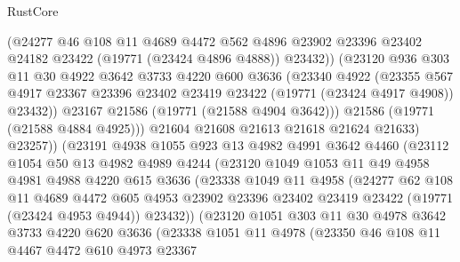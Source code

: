 \begin{lexlean}{RustCore}
\begin{coremodule}
                (@24277
                  @46
                  @108
                  @11
                  @4689
                  @4472
                  @562
                  @4896
                  @23902
                  @23396
                  @23402
                  @24182
                  @23422
                  (@19771 (@23424 @4896 @4888))
                  @23432))
              (@23120
                @936
                @303
                @11
                @30
                @4922
                @3642
                @3733
                @4220
                @600
                @3636
                (@23340
                  @4922
                  (@23355
                    @567
                    @4917
                    @23367
                    @23396
                    @23402
                    @23419
                    @23422
                    (@19771 (@23424 @4917 @4908))
                    @23432))
                @23167
                @21586
                (@19771 (@21588 @4904 @3642)))
              @21586
              (@19771 (@21588 @4884 @4925)))
            @21604
            @21608
            @21613
            @21618
            @21624
            @21633)
          @23257))
      (@23191
        @4938
        @1055
        @923
        @13
        @4982
        @4991
        @3642
        @4460
        (@23112
          @1054
          @50
          @13
          @4982
          @4989
          @4244
          (@23120
            @1049
            @1053
            @11
            @49
            @4958
            @4981
            @4988
            @4220
            @615
            @3636
            (@23338
              @1049
              @11
              @4958
              (@24277
                @62
                @108
                @11
                @4689
                @4472
                @605
                @4953
                @23902
                @23396
                @23402
                @23419
                @23422
                (@19771 (@23424 @4953 @4944))
                @23432))
            (@23120
              @1051
              @303
              @11
              @30
              @4978
              @3642
              @3733
              @4220
              @620
              @3636
              (@23338
                @1051
                @11
                @4978
                (@23350
                  @46
                  @108
                  @11
                  @4467
                  @4472
                  @610
                  @4973
                  @23367

\end{coremodule}
\end{lexlean}
